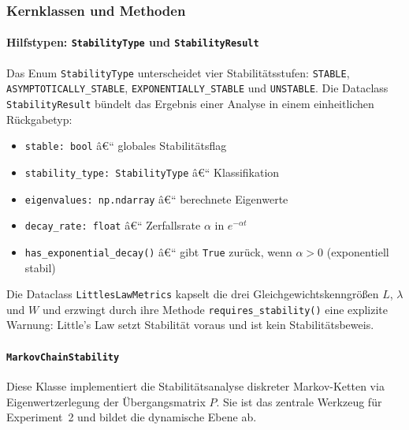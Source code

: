﻿\documentclass[a4paper,12pt]{scrreprt}
\theoremstyle{definition}
\begin{document}
\subsubsection{Kernklassen und Methoden}
\label{subsubsec:klassen}

\paragraph{Hilfstypen: \texttt{StabilityType} und \texttt{StabilityResult}}

Das Enum \texttt{StabilityType} unterscheidet vier Stabilitätsstufen:
\texttt{STABLE}, \texttt{ASYMPTOTICALLY\_STABLE},
\texttt{EXPONEN\newline TIALLY\_STABLE} und \texttt{UNSTABLE}.  Die Dataclass
\texttt{StabilityResult} bündelt das Ergebnis einer Analyse in einem
einheitlichen Rückgabetyp:

\begin{itemize}
	\item \texttt{stable: bool} â€“ globales Stabilitätsflag
	\item \texttt{stability\_type: StabilityType} â€“ Klassifikation
	\item \texttt{eigenvalues: np.ndarray} â€“ berechnete Eigenwerte
	\item \texttt{decay\_rate: float} â€“ Zerfallsrate $\alpha$ in $e^{-\alpha t}$
	\item \texttt{has\_exponential\_decay()} â€“ gibt \texttt{True}
	zurück, wenn $\alpha > 0$ (exponentiell stabil)
\end{itemize}

Die Dataclass \texttt{LittlesLawMetrics} kapselt die drei
Gleichgewichtskenngrößen $L$, $\lambda$ und $W$ und erzwingt durch
ihre Methode \texttt{requires\_stability()} eine explizite Warnung:
Little's Law setzt Stabilität voraus und ist kein Stabilitätsbeweis.

\paragraph{\texttt{MarkovChainStability}}

Diese Klasse implementiert die Stabilitätsanalyse diskreter
Markov-Ketten via Eigenwertzerlegung der Übergangsmatrix $P$.  Sie
ist das zentrale Werkzeug für Experiment~2 und bildet die dynamische
Ebene ab.
\end{document}
